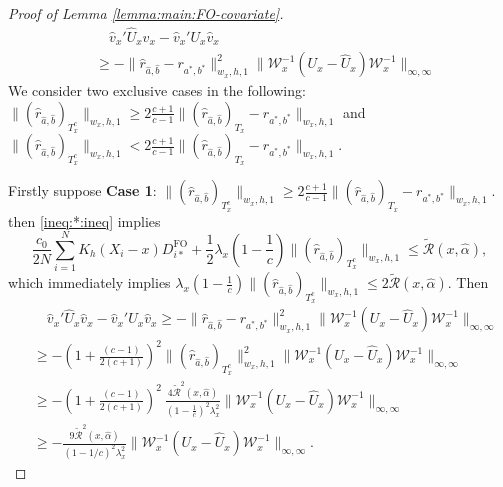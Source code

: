 \documentclass[11pt]{article}
\begin{document}
\begin{proof}[Proof of Lemma \ref{lemma:main:FO-covariate}]
\begin{equation}\label{eq:holder}
\begin{array}{rl}
&\quad\displaystyle\hat v_x'\hat U_x \hat v_x  - \hat v_x' U_x \hat v_x\\
&\displaystyle\geq \! - \|\hat r_{\hat a,\hat b} - r_{a^*,b^*}\|_{w_x,h,1}^2 \! \|\mathcal{W}_x^{-1}\!(U_x-\hat U_x)\!\mathcal{W}_x^{-1}\|_{\infty,\infty}
\end{array}
\end{equation}
We consider two exclusive cases in the following: $\|(\hat r_{\hat a,\hat b})_{T_x^c}\|_{w_x,h,1} \geq 2\frac{c+1}{c-1}\|(\hat r_{\hat a,\hat b})_{T_x} - r_{a^*,b^*}\|_{w_x,h,1}$ and $\|(\hat r_{\hat a,\hat b})_{T_x^c}\|_{w_x,h,1} < 2\frac{c+1}{c-1}\|(\hat r_{\hat a,\hat b})_{T_x} - r_{a^*,b^*}\|_{w_x,h,1}$. 

Firstly suppose \textbf{Case 1}: $\|(\hat r_{\hat a,\hat b})_{T_x^c}\|_{w_x,h,1} \geq 2\frac{c+1}{c-1}\|(\hat r_{\hat a,\hat b})_{T_x} - r_{a^*,b^*}\|_{w_x,h,1}$.
then \eqref{ineq:*:ineq} implies 
$$\frac{c_0}{2N}\sum_{i=1}^NK_h(X_i-x)D_{i*}^{\mathrm{FO}} + \frac{1}{2}\lambda_x\left(1-\frac{1}{c}\right)\|(\hat r_{\hat a,\hat b})_{T^c_x}\|_{w_x,h,1}\leq\widetilde{\mathcal{R}}(x,\hat\alpha),$$ 
which immediately implies $\lambda_x\left(1-\frac{1}{c}\right)\|(\hat r_{\hat a,\hat b})_{T^c_x}\|_{w_x,h,1}\leq2\widetilde{\mathcal{R}}(x,\hat\alpha)$. Then 
$$\begin{array}{rl}
&\quad\displaystyle\hat v_x'\hat U_x \hat v_x  - \hat v_x' U_x \hat v_x \geq  - \|\hat r_{\hat a,\hat b} - r_{a^*,b^*}\|_{w_x,h,1}^2  \|\mathcal{W}_x^{-1}(U_x-\hat U_x)\mathcal{W}_x^{-1}\|_{\infty,\infty}\\
&\displaystyle\geq  - \left(1+\frac{(c-1)}{2(c+1)}\right)^2\| (\hat r_{\hat a, \hat b})_{T_x^c}\|_{w_x,h,1}^2 \|\mathcal{W}_x^{-1}(U_x-\hat U_x)\mathcal{W}_x^{-1}\|_{\infty,\infty}\\
&\displaystyle\geq-\left(1+\frac{(c-1)}{2(c+1)}\right)^2\ \frac{4\widetilde{\mathcal{R}}^2(x,\hat\alpha)}{(1-\frac{1}{c})^2\lambda^2_x}  \|\mathcal{W}_x^{-1}(U_x-\hat U_x)\mathcal{W}_x^{-1}\|_{\infty,\infty}\\
&\displaystyle\geq-\frac{9\widetilde{\mathcal{R}}^2(x,\hat\alpha)}{(1-1/c)^2\lambda_x^2}\|\mathcal{W}_x^{-1}(U_x-\hat U_x)\mathcal{W}_x^{-1}\|_{\infty,\infty}.
\end{array}$$

\end{proof}
\end{document}
